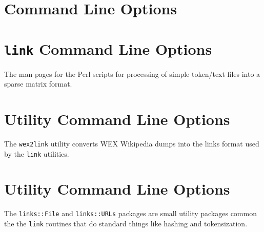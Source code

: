 \documentclass{article}
\begin{document}
\newpage
\appendix
\section{Command Line Options}
%
%

\section{{\tt link} Command Line Options}

The man pages for the Perl scripts for
processing of simple token/text files into a sparse matrix format.










\section{Utility Command Line Options}

The {\tt wex2link} utility converts WEX Wikipedia dumps into the links format used by the
{\tt link} utilities.



\section{Utility Command Line Options}

The {\tt links::File} and {\tt links::URLs} packages are small utility packages
common the the {\tt link} routines that do standard things like
hashing and tokensization.



\end{document}
